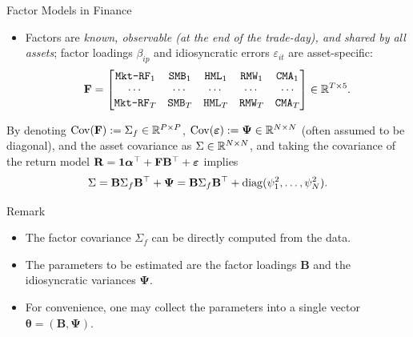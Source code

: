 \documentclass[10pt,aspectratio=169]{beamer}
\newcommand{\Nassets}{N}
\newcommand{\Kcard}{k}
\newcommand{\Wset}{\mathcal{W}}
\newcommand{\Param}{\theta}
\newcommand{\SigmaMat}{\Sigma}
\begin{document}
\begin{frame}[allowframebreaks]{Factor Models in Finance}
\begin{itemize}
    \item Factors are \emph{known, observable (at the end of the trade-day), and shared by all assets}; factor loadings $\beta_{ip}$ and idiosyncratic errors $\varepsilon_{it}$ are asset-specific:
      {
      \[
        \mathbf{F} =
        \begin{bmatrix}
          \texttt{Mkt-RF}_1 & \texttt{SMB}_1 & \texttt{HML}_1 & \texttt{RMW}_1 & \texttt{CMA}_1 \\
          \cdots & \cdots & \cdots & \cdots & \cdots \\
          \texttt{Mkt-RF}_T & \texttt{SMB}_T & \texttt{HML}_T & \texttt{RMW}_T & \texttt{CMA}_T
        \end{bmatrix}
        \in \mathbb{R}^{T\times 5}.
      \] 
      }
      \end{itemize}
  \framebreak
  \small
    By denoting $\operatorname{Cov}(\mathbf{F}) := \SigmaMat_f \in \RR^{P\times P}$, $\operatorname{Cov}(\boldsymbol{\varepsilon}) := \boldsymbol{\Psi} \in \mathbb{R}^{N\times N}$ (often assumed to be diagonal), and the asset covariance as $\SigmaMat \in \RR^{N\times N}$, and taking the covariance of the return model $\mathbf{R} = \mathbf{1} \boldsymbol{\alpha}^\top + \mathbf{F}\mathbf{B}^\top + \boldsymbol{\varepsilon}$ implies
    \[
      \SigmaMat = \mathbf{B} \SigmaMat_f \mathbf{B}^\top + \boldsymbol{\Psi} = \mathbf{B} \SigmaMat_f \mathbf{B}^\top + \diag(\psi_1^2, \ldots, \psi_N^2).
    \]
    \begin{block}{\small Remark}
          \begin{itemize}
            \small
            \vspace{0.4em}
          \item The factor covariance $\SigmaMat_f$ can be directly computed from the data.
          \item The parameters to be estimated are the factor loadings $\mathbf{B}$ and the idiosyncratic variances $\boldsymbol{\Psi}$.
          \item For convenience, one may collect the parameters into a single vector $\boldsymbol{\Param} = (\mathbf{B}, \boldsymbol{\Psi})$.
        \end{itemize}
    \end{block}
\end{frame}

\end{document}
